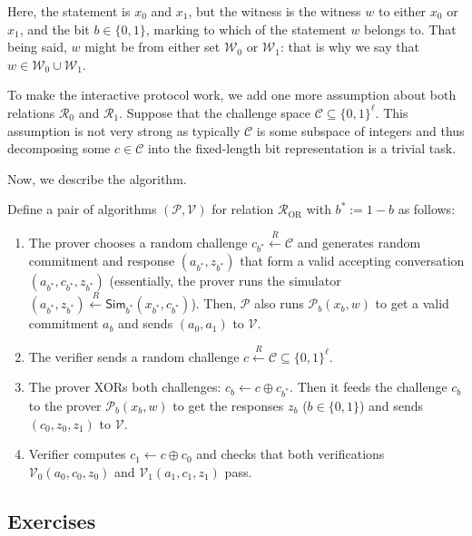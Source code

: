 \documentclass[../lecture-notes.tex]{subfiles}
\begin{document}
Here, the statement is $x_0$ and $x_1$, but the witness is the witness $w$ to either $x_0$ or $x_1$, and the bit $b \in \{0,1\}$, marking to which of the statement $w$ belongs to. That being said, $w$ might be from either set $\mathcal{W}_0$ or $\mathcal{W}_1$: that is why we say that $w \in \mathcal{W}_0 \cup \mathcal{W}_1$.

To make the interactive protocol work, we add one more assumption about both relations $\mathcal{R}_0$ and $\mathcal{R}_1$. Suppose that the challenge space $\mathcal{C} \subseteq \{0,1\}^{\ell}$. This assumption is not very strong as typically $\mathcal{C}$ is some subspace of integers and thus decomposing some $c \in \mathcal{C}$ into the fixed-length bit representation is a trivial task.

Now, we describe the algorithm.

\begin{definition}
    Define a pair of algorithms $(\mathcal{P},\mathcal{V})$ for relation $\mathcal{R}_{\text{OR}}$ with $b^* := 1-b$ as follows:
    \begin{enumerate}
        \item The prover chooses a random challenge $c_{b^*} \xleftarrow{R} \mathcal{C}$ and generates random commitment and response $(a_{b^*}, z_{b^*})$ that form a valid accepting conversation $(a_{b^*}, c_{b^*}, z_{b^*})$ (essentially, the prover runs the simulator $(a_{b^*}, z_{b^*}) \xleftarrow{R} \mathsf{Sim}_{b^*}(x_{b^*}, c_{b^*})$). Then, $\mathcal{P}$ also runs $\mathcal{P}_b(x_b, w)$ to get a valid commitment $a_b$ and sends $(a_0,a_1)$ to $\mathcal{V}$.
        \item The verifier sends a random challenge $c \xleftarrow{R} \mathcal{C} \subseteq \{0,1\}^{\ell}$.
        \item The prover XORs both challenges: $c_b \gets c \oplus c_{b^*}$. Then it feeds the challenge $c_b$ to the prover $\mathcal{P}_b(x_b,w)$ to get the responses $z_b$ ($b \in \{0,1\}$) and sends $(c_0,z_0,z_1)$ to $\mathcal{V}$.
        \item Verifier computes $c_1 \gets c \oplus c_0$ and checks that both verifications $\mathcal{V}_0(a_0,c_0,z_0)$ and $\mathcal{V}_1(a_1,c_1,z_1)$ pass.
    \end{enumerate}
\end{definition}

\subsection{Exercises}
\end{document}
